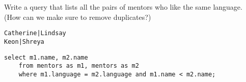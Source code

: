 \begin{blocksection}
\question Write a query that lists all the pairs of mentors who like the same language. (How can we make sure to remove duplicates?)

\begin{lstlisting}
Catherine|Lindsay
Keon|Shreya
\end{lstlisting}

\begin{solution}[1in]
\begin{lstlisting}
select m1.name, m2.name
    from mentors as m1, mentors as m2
    where m1.language = m2.language and m1.name < m2.name;
\end{lstlisting}
\end{solution}
\end{blocksection}
